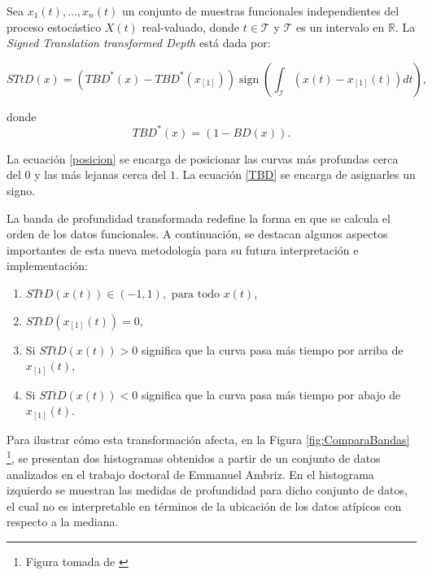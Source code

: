     \begin{defn}
        Sea  $x_1(t), \dots , x_n(t)$ un conjunto de muestras funcionales independientes del proceso estocástico $X(t)$ real-valuado,  donde $t \in \mathcal{T}$ y $\mathcal{T}$ es un intervalo en $\mathbb{R}$. La \textit{Signed Translation transformed Depth} está dada por:

    \begin{equation}\label{TBD}
    STtD(x)=\left(T B D^*(x)-T B D^*\left(x_{[1]}\right)\right) \operatorname{sign}\left(\int_{\mathcal{I}}\left(x(t)-x_{[1]}(t)\right) d t\right),
    \end{equation}

    donde
    \begin{equation}\label{posicion}
        T B D^*(x)=(1-B D(x)).
    \end{equation}

    La ecuación \eqref{posicion} se encarga de posicionar las curvas más profundas cerca del $0$ y las más lejanas cerca del $1$. La ecuación \eqref{TBD} se encarga de asignarles un signo.
        
    \end{defn}


La banda de profundidad transformada redefine la forma en que se calcula el orden de los datos funcionales. A continuación, se destacan algunos aspectos importantes de esta nueva metodología para su futura interpretación e implementación:

\begin{enumerate}
    \item $STtD(x(t)) \in (-1, 1), \text{ para todo } x(t)$,
    \item $STtD(x_{[1]}(t)) = 0,$
    \item Si $STtD(x(t)) > 0$ significa que la curva pasa más tiempo por arriba de $x_{[1]}(t)$,
    \item Si $STtD(x(t)) < 0$ significa que la curva pasa más tiempo por abajo de $x_{[1]}(t)$.
\end{enumerate}

Para ilustrar cómo esta transformación afecta, en la Figura \ref{fig:ComparaBandas} \footnote{Figura tomada de \cite{BandaEmanuel}}, se presentan dos histogramas obtenidos a partir de un conjunto de datos analizados en el trabajo doctoral de Emmanuel Ambriz. En el histograma izquierdo se muestran las medidas de profundidad para dicho conjunto de datos, el cual no es interpretable en términos de la ubicación de los datos atípicos con respecto a la mediana.

